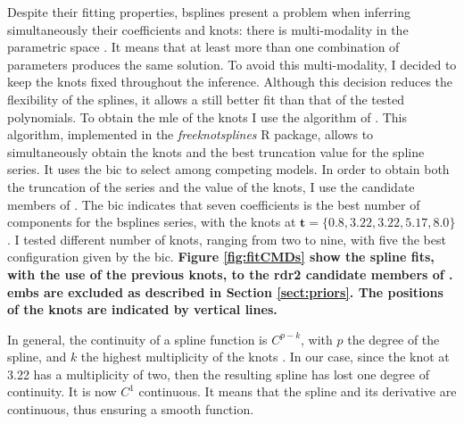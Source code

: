 Despite their fitting properties, \glspl{bspline} present a problem when inferring simultaneously their coefficients and knots: there is multi-modality in the parametric space \citep{Lindstrom1999}. It means that at least more than one combination of parameters produces the same solution. To avoid this multi-modality, I decided to keep the knots fixed throughout the inference. Although this decision reduces the flexibility of the splines, it allows a still better fit than that of the tested polynomials. To obtain the \gls{mle} of the knots I use the algorithm of  \citet{Spiriti2013}. This algorithm, implemented in the \emph{freeknotsplines} R package, allows to simultaneously obtain the knots and the best truncation value for the spline series. It uses the \gls{bic} to select among competing models. In order to obtain both the truncation of the series and the value of the knots, I use the candidate members of \citet{Bouy2015}. The \gls{bic} indicates that seven coefficients is the best number of components for the \glspl{bspline} series, with the knots at $\mathbf{t}=\{0.8,3.22,3.22,5.17,8.0\}$. I tested different number of knots, ranging from two to nine, with five the best configuration given by the \gls{bic}. \textbf{Figure \ref{fig:fitCMDs} show the spline fits, with the use of the previous knots, to the \gls{rdr2} candidate members of \citet{Bouy2015}. \glspl{emb} are excluded as described in Section \ref{sect:priors}. The positions of the knots are indicated by vertical lines.} 

In general, the continuity of a spline function is $C^{p-k}$, with $p$ the degree of the spline, and $k$ the highest multiplicity of the knots \citep{deBoor1978}. In our case, since the knot at 3.22 has a multiplicity of two, then the resulting spline has lost one degree of continuity. It is now $C^1$ continuous. It means that the spline and its derivative are continuous, thus ensuring a smooth function.

